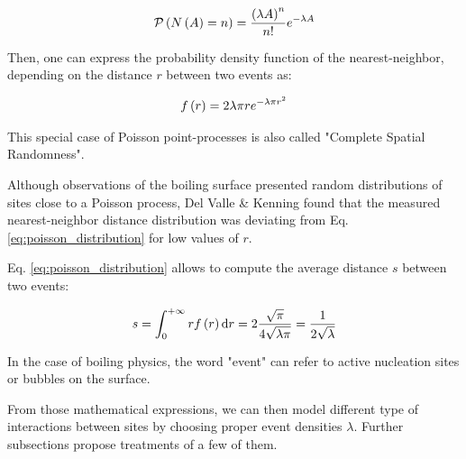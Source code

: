 \begin{equation}
\mathcal{P}\left( N\left( A \right)=n \right)=\frac{\left( \lambda A \right)^{n}}{n!}e^{-\lambda A}
\label{eq:poisson_proba}
\end{equation}

Then, one can express the probability density function of the nearest-neighbor, depending on the distance $r$ between two events as:

\begin{align}
f\left( r \right)=2\lambda \pi r e^{-\lambda \pi r^{2}}
\label{eq:poisson_distribution}
\end{align} 


This special case of Poisson point-processes is also called "Complete Spatial Randomness".


\begin{remark*}{}
Although observations of the boiling surface presented random distributions of sites close to a Poisson process, Del Valle \& Kenning \cite{del_valle_subcooled_1985} found that the measured nearest-neighbor distance distribution was deviating from Eq. \ref{eq:poisson_distribution} for low values of $r$.
\end{remark*}

Eq. \ref{eq:poisson_distribution} allows to compute the average distance $s$ between two events:

\begin{equation}
s = \int_{0}^{+\infty} r f\left( r \right)\mathrm{d}r  = 2 \frac{\sqrt{\pi}}{4\sqrt{\lambda \pi}} = \frac{1}{2\sqrt{\lambda}}
\label{eq:poisson_avg_dist}
\end{equation}

\begin{note*}{}
In the case of boiling physics, the word "event" can refer to active nucleation sites or bubbles on the surface.
\end{note*}


\npar

From those mathematical expressions, we can then model different type of interactions between sites by choosing proper event densities $\lambda$. Further subsections propose treatments of a few of them.


%
%
%
%
%
%

